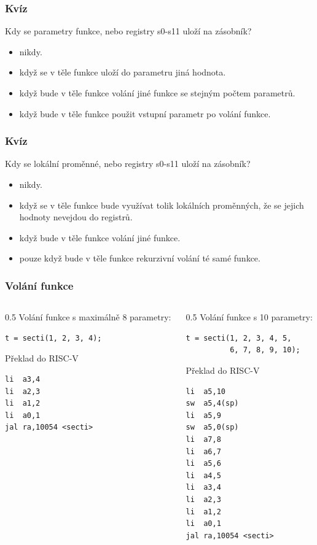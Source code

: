 \documentclass{beamer}
\begin{document}
\begin{frame}
\frametitle{Kvíz}

Kdy se parametry funkce, nebo registry s0-s11 uloží na zásobník?
\begin{itemize}
 \item[A] nikdy.
 \item[B] když se v těle funkce uloží do parametru jiná hodnota.
 \item[C] když bude v těle funkce volání jiné funkce se stejným počtem parametrů.
 \item[D] když bude v těle funkce použit vstupní parametr po volání funkce.
\end{itemize}
\end{frame}


\begin{frame}
\frametitle{Kvíz}

Kdy se lokální proměnné, nebo registry s0-s11 uloží na zásobník?
\begin{itemize}
 \item[A] nikdy.
 \item[B] když se v těle funkce bude využívat tolik lokálních proměnných, že se jejich hodnoty nevejdou do registrů.
 \item[C] když bude v těle funkce volání jiné funkce.
 \item[D] pouze když bude v těle funkce rekurzivní volání té samé funkce.
\end{itemize}
\end{frame}


\begin{frame}[fragile]
\frametitle{Volání funkce}

\begin{columns}
\begin{column}{0.5\textwidth}
Volání funkce s maximálně 8 parametry:

\begin{verbatim}
t = secti(1, 2, 3, 4);
\end{verbatim}

Překlad do RISC-V
\begin{verbatim}
li  a3,4
li  a2,3
li  a1,2
li  a0,1
jal ra,10054 <secti>
\end{verbatim}

\end{column}
\begin{column}{0.5\textwidth}  
Volání funkce s 10 parametry:

\begin{verbatim}
t = secti(1, 2, 3, 4, 5, 
          6, 7, 8, 9, 10);
\end{verbatim}

Překlad do RISC-V
\begin{verbatim}
li  a5,10
sw  a5,4(sp)
li  a5,9
sw  a5,0(sp)
li  a7,8
li  a6,7
li  a5,6
li  a4,5
li  a3,4
li  a2,3
li  a1,2
li  a0,1
jal ra,10054 <secti>
\end{verbatim}
\end{column}
\end{columns}
\end{frame}
\end{document}
